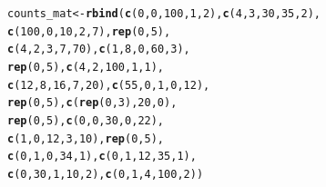 \documentclass[12pt]{article}\usepackage[]{graphicx}\usepackage[usenames,dvipsnames]{color}
\makeatletter
\newcommand{\hlnum}[1]{\textcolor[rgb]{0.686,0.059,0.569}{#1}}%
\newcommand{\hlstd}[1]{\textcolor[rgb]{0.345,0.345,0.345}{#1}}%
\newcommand{\hlkwb}[1]{\textcolor[rgb]{0.69,0.353,0.396}{#1}}%
\newcommand{\hlkwd}[1]{\textcolor[rgb]{0.737,0.353,0.396}{\textbf{#1}}}%
\newenvironment{kframe}{%
 \def\at@end@of@kframe{}%
 \ifinner\ifhmode%
  \def\at@end@of@kframe{\end{minipage}}%
  \begin{minipage}{\columnwidth}%
 \fi\fi%
 \def\FrameCommand##1{\hskip\@totalleftmargin \hskip-\fboxsep
 \colorbox{shadecolor}{##1}\hskip-\fboxsep
     \hskip-\linewidth \hskip-\@totalleftmargin \hskip\columnwidth}%
 \MakeFramed {\advance\hsize-\width
   \@totalleftmargin\z@ \linewidth\hsize
   \@setminipage}}%
 {\par\unskip\endMakeFramed%
 \at@end@of@kframe}
\newenvironment{knitrout}{}{} %
\makeatother
\begin{document}
\begin{knitrout}
\color{fgcolor}\begin{kframe}
\begin{alltt}
\hlstd{counts_mat} \hlkwb{<-} \hlkwd{rbind}\hlstd{(}\hlkwd{c}\hlstd{(}\hlnum{0}\hlstd{,} \hlnum{0}\hlstd{,} \hlnum{100}\hlstd{,} \hlnum{1}\hlstd{,} \hlnum{2}\hlstd{),} \hlkwd{c}\hlstd{(}\hlnum{4}\hlstd{,} \hlnum{3}\hlstd{,} \hlnum{30}\hlstd{,} \hlnum{35}\hlstd{,} \hlnum{2}\hlstd{),}
                    \hlkwd{c}\hlstd{(}\hlnum{100}\hlstd{,} \hlnum{0}\hlstd{,} \hlnum{10}\hlstd{,} \hlnum{2}\hlstd{,} \hlnum{7}\hlstd{),}\hlkwd{rep}\hlstd{(}\hlnum{0}\hlstd{,}\hlnum{5}\hlstd{),}
                    \hlkwd{c}\hlstd{(}\hlnum{4}\hlstd{,} \hlnum{2}\hlstd{,} \hlnum{3}\hlstd{,} \hlnum{7}\hlstd{,} \hlnum{70}\hlstd{),} \hlkwd{c}\hlstd{(}\hlnum{1}\hlstd{,} \hlnum{8}\hlstd{,} \hlnum{0}\hlstd{,} \hlnum{60}\hlstd{,} \hlnum{3}\hlstd{),}
                    \hlkwd{rep}\hlstd{(}\hlnum{0}\hlstd{,} \hlnum{5}\hlstd{),} \hlkwd{c}\hlstd{(}\hlnum{4}\hlstd{,} \hlnum{2}\hlstd{,} \hlnum{100}\hlstd{,} \hlnum{1}\hlstd{,} \hlnum{1}\hlstd{),}
                    \hlkwd{c}\hlstd{(}\hlnum{12}\hlstd{,} \hlnum{8}\hlstd{,} \hlnum{16}\hlstd{,} \hlnum{7}\hlstd{,} \hlnum{20}\hlstd{),} \hlkwd{c}\hlstd{(}\hlnum{55}\hlstd{,} \hlnum{0}\hlstd{,} \hlnum{1}\hlstd{,} \hlnum{0}\hlstd{,} \hlnum{12}\hlstd{),}
                    \hlkwd{rep}\hlstd{(}\hlnum{0}\hlstd{,}\hlnum{5}\hlstd{),} \hlkwd{c}\hlstd{(}\hlkwd{rep}\hlstd{(}\hlnum{0}\hlstd{,}\hlnum{3}\hlstd{),} \hlnum{20}\hlstd{,} \hlnum{0}\hlstd{),}
                    \hlkwd{rep}\hlstd{(}\hlnum{0}\hlstd{,}\hlnum{5}\hlstd{),} \hlkwd{c}\hlstd{(}\hlnum{0}\hlstd{,} \hlnum{0}\hlstd{,} \hlnum{30}\hlstd{,} \hlnum{0}\hlstd{,} \hlnum{22}\hlstd{),}
                    \hlkwd{c}\hlstd{(}\hlnum{1}\hlstd{,} \hlnum{0}\hlstd{,} \hlnum{12}\hlstd{,} \hlnum{3}\hlstd{,} \hlnum{10}\hlstd{),} \hlkwd{rep}\hlstd{(}\hlnum{0}\hlstd{,}\hlnum{5}\hlstd{),}
                    \hlkwd{c}\hlstd{(}\hlnum{0}\hlstd{,} \hlnum{1}\hlstd{,} \hlnum{0}\hlstd{,} \hlnum{34}\hlstd{,} \hlnum{1}\hlstd{),} \hlkwd{c}\hlstd{(}\hlnum{0}\hlstd{,} \hlnum{1}\hlstd{,} \hlnum{12}\hlstd{,} \hlnum{35}\hlstd{,} \hlnum{1}\hlstd{),}
                    \hlkwd{c}\hlstd{(}\hlnum{0}\hlstd{,} \hlnum{30}\hlstd{,} \hlnum{1}\hlstd{,} \hlnum{10}\hlstd{,} \hlnum{2}\hlstd{),} \hlkwd{c}\hlstd{(}\hlnum{0}\hlstd{,} \hlnum{1}\hlstd{,} \hlnum{4}\hlstd{,} \hlnum{100}\hlstd{,} \hlnum{2}\hlstd{))}
\end{alltt}
\end{kframe}
\end{knitrout}
\end{document}
